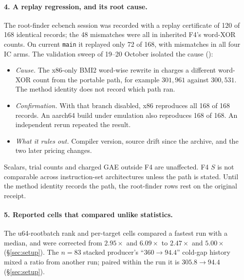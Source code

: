 \paragraph{4. A replay regression, and its root cause.} The root-finder
ecbench session was recorded with a replay certificate of 120 of 168
identical records; the 48 mismatches were all in inherited F4's word-XOR
counts. On current \texttt{main} it replayed only 72 of 168, with
mismatches in all four IC arms. The validation sweep of 19--20 October
isolated the cause ():
\begin{itemize}
\item \emph{Cause.} The x86-only BMI2 word-wise rewrite in
   charges a different word-XOR
  count from the portable path, for example $301{,}961$ against
  $300{,}531$. The method identity does not record which path ran.
\item \emph{Confirmation.} With that branch disabled, x86 reproduces all
  168 of 168 records. An aarch64 build under emulation also reproduces 168
  of 168. An independent rerun repeated the result.
\item \emph{What it rules out.} Compiler version, source drift since the
  archive, and the two later pricing changes.
\end{itemize}
Scalars, trial counts and charged GAE outside F4 are unaffected. F4 $S$ is
not comparable across instruction-set architectures unless the path is
stated. Until the method identity records the path, the root-finder rows
rest on the original receipt.

\paragraph{5. Reported cells that compared unlike statistics.} The
u64-rootbatch rank and per-target cells compared a fastest run with a
median, and were corrected from $2.95\times$ and $6.09\times$ to $2.47\times$
and $5.00\times$ (\S\ref{sec:setup}). The $n=83$ stacked producer's
``$360\to94.4$'' cold-gap history mixed a ratio from another run; paired
within the run it is $305.8\to94.4$ (\S\ref{sec:setup}).

